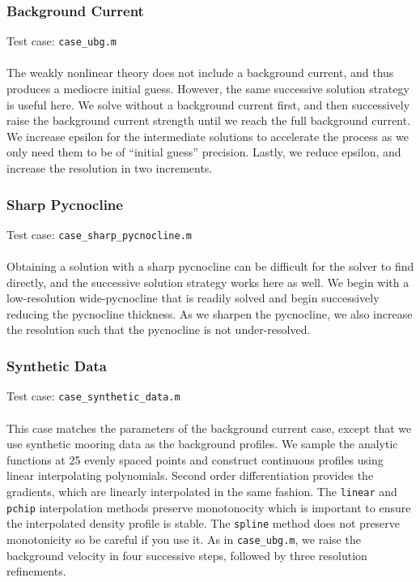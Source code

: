 \documentclass[letterpaper]{article}
\begin{document}
\subsubsection{Background Current}
Test case: \verb"case_ubg.m" \\\\
The weakly nonlinear theory does not include a background current, and thus produces a mediocre initial guess.
However, the same successive solution strategy is useful here.
We solve without a background current first, and then successively raise the background current strength until we reach the full background current.
We increase epsilon for the intermediate solutions to accelerate the process as we only need them to be of ``initial guess'' precision.
Lastly, we reduce epsilon, and increase the resolution in two increments.

\subsubsection{Sharp Pycnocline}
Test case: \verb"case_sharp_pycnocline.m" \\\\
Obtaining a solution with a sharp pycnocline can be difficult for the solver to find directly, and the successive solution strategy works here as well.
We begin with a low-resolution wide-pycnocline that is readily solved and begin successively reducing the pycnocline thickness.
As we sharpen the pycnocline, we also increase the resolution such that the pycnocline is not under-resolved.

\subsubsection{Synthetic Data}
Test case: \verb"case_synthetic_data.m" \\\\
This case matches the parameters of the background current case, except that we use synthetic mooring data as the background profiles.
We sample the analytic functions at 25 evenly spaced points and construct continuous profiles using linear interpolating polynomials.
Second order differentiation provides the gradients, which are linearly interpolated in the same fashion.
The \verb+linear+ and \verb+pchip+ interpolation methods preserve monotonocity which is important to ensure the interpolated density profile is stable.
The \verb+spline+ method does not preserve monotonicity so be careful if you use it.
As in \verb"case_ubg.m", we raise the background velocity in four successive steps, followed by three resolution refinements.
\end{document}
